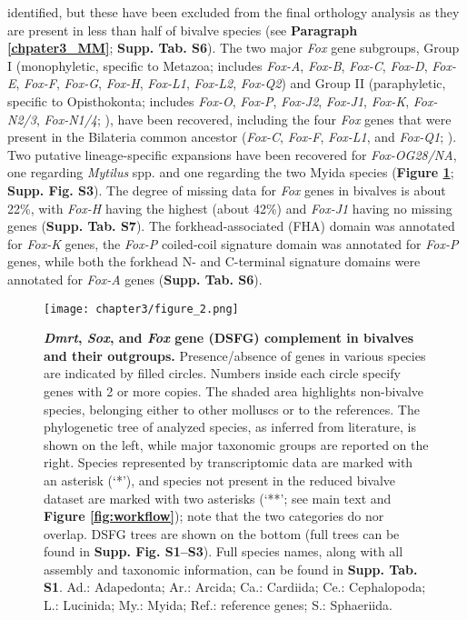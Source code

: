 \documentclass[../main.tex]{subfiles}
\begin{document}
identified, but these have been excluded from the final orthology analysis as they are present in less than half of bivalve species (see \textbf{Paragraph \ref{chpater3_MM}}; \textbf{Supp. Tab. S6}). The two major \textit{Fox} gene subgroups, Group I (monophyletic, specific to Metazoa; includes \textit{Fox-A}, \textit{Fox-B}, \textit{Fox-C}, \textit{Fox-D}, \textit{Fox-E}, \textit{Fox-F}, \textit{Fox-G}, \textit{Fox-H}, \textit{Fox-L1}, \textit{Fox-L2}, \textit{Fox-Q2}) and Group II (paraphyletic, specific to Opisthokonta; includes \textit{Fox-O}, \textit{Fox-P}, \textit{Fox-J2}, \textit{Fox-J1}, \textit{Fox-K}, \textit{Fox-N2/3}, \textit{Fox-N1/4}; \textbf{\cite{larroux2008genesis}}), have been recovered, including the four \textit{Fox} genes that were present in the Bilateria common ancestor (\textit{Fox-C}, \textit{Fox-F}, \textit{Fox-L1}, and \textit{Fox-Q1}; \textbf{\cite{shimeld2010clustered}}). Two putative lineage-specific expansions have been recovered for \textit{Fox-OG28/NA}, one regarding \textit{Mytilus} spp. and one regarding the two Myida species (\textbf{Figure \ref{fig:DSFG_bivalveCompilation}}; \textbf{Supp. Fig. S3}). The degree of missing data for \textit{Fox} genes in bivalves is about 22\%, with \textit{Fox-H} having the highest (about 42\%) and \textit{Fox-J1} having no missing genes (\textbf{Supp. Tab. S7}). The forkhead-associated (FHA) domain was annotated for \textit{Fox-K} genes, the \textit{Fox-P} coiled-coil signature domain was annotated for \textit{Fox-P} genes, while both the forkhead N- and C-terminal signature domains were annotated for \textit{Fox-A} genes (\textbf{Supp. Tab. S6}).

\begin{figure}[]
    \centering
    \texttt{[image: chapter3/figure\_2.png]}
    \captionsetup{width=\textwidth}
    \caption{
    \textbf{\textit{Dmrt}, \textit{Sox}, and \textit{Fox} gene (DSFG) complement in bivalves and their outgroups.} Presence/absence of genes in various species are indicated by filled circles. Numbers inside each circle specify genes with 2 or more copies. The shaded area highlights non-bivalve species, belonging either to other molluscs or to the references. The phylogenetic tree of analyzed species, as inferred from literature, is shown on the left, while major taxonomic groups are reported on the right. Species represented by transcriptomic data are marked with an asterisk (‘*’), and species not present in the reduced bivalve dataset are marked with two asterisks (‘**’; see main text and \textbf{Figure \ref{fig:workflow}}); note that the two categories do nor overlap. DSFG trees are shown on the bottom (full trees can be found in \textbf{Supp. Fig. S1--S3}). Full species names, along with all assembly and taxonomic information, can be found in \textbf{Supp. Tab. S1}.  Ad.: Adapedonta; Ar.: Arcida; Ca.: Cardiida; Ce.: Cephalopoda; L.: Lucinida; My.: Myida; Ref.: reference genes; S.: Sphaeriida.
    }
    \label{fig:DSFG_bivalveCompilation}
\end{figure}
\end{document}
